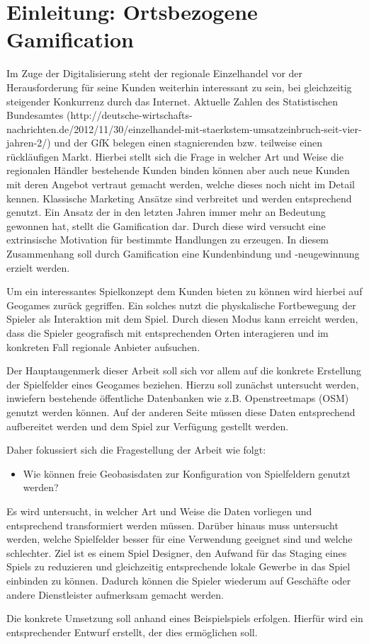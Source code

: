 \chapter{Einleitung: Ortsbezogene Gamification}
\label{ch1:S1_Einleitung}

Im Zuge der Digitalisierung steht der regionale Einzelhandel vor der Herausforderung für seine Kunden weiterhin interessant zu sein, bei gleichzeitig steigender Konkurrenz durch das Internet. Aktuelle Zahlen des Statistischen Bundesamtes (http://deutsche-wirtschafts-nachrichten.de/2012/11/30/einzelhandel-mit-staerkstem-umsatzeinbruch-seit-vier-jahren-2/) und der GfK belegen einen stagnierenden bzw. teilweise einen rückläufigen Markt.
Hierbei stellt sich die Frage in welcher Art und Weise die regionalen Händler bestehende Kunden binden können aber auch neue Kunden mit deren Angebot vertraut gemacht werden, welche dieses noch nicht im Detail kennen.
Klassische Marketing Ansätze sind verbreitet und werden entsprechend genutzt.
Ein Ansatz der in den letzten Jahren immer mehr an Bedeutung gewonnen hat, stellt die Gamification dar. Durch diese wird versucht eine extrinsische Motivation für bestimmte Handlungen zu erzeugen. In diesem Zusammenhang soll durch Gamification eine Kundenbindung und -neugewinnung erzielt werden.

Um ein interessantes Spielkonzept dem Kunden bieten zu können wird hierbei auf Geogames zurück gegriffen.
Ein solches nutzt die physkalische Fortbewegung der Spieler als Interaktion mit dem Spiel.
Durch diesen Modus kann erreicht werden, dass die Spieler geografisch mit entsprechenden Orten interagieren und im konkreten Fall regionale Anbieter aufsuchen.

Der Hauptaugenmerk dieser Arbeit soll sich vor allem auf die konkrete Erstellung der Spielfelder eines Geogames beziehen. Hierzu soll zunächst untersucht werden, inwiefern bestehende öffentliche Datenbanken wie z.B. Openstreetmaps (OSM) genutzt werden können. Auf der anderen Seite müssen diese Daten entsprechend aufbereitet werden und dem Spiel zur Verfügung gestellt werden.

Daher fokussiert sich die Fragestellung der Arbeit wie folgt:
\begin{itemize}
  \item Wie können freie Geobasisdaten zur Konfiguration von Spielfeldern genutzt werden?
\end{itemize}

Es wird untersucht, in welcher Art und Weise die Daten vorliegen und entsprechend transformiert werden müssen.
Darüber hinaus muss untersucht werden, welche Spielfelder besser für eine Verwendung geeignet sind und welche schlechter.
Ziel ist es einem Spiel Designer, den Aufwand für das Staging eines Spiels zu reduzieren und gleichzeitig entsprechende lokale Gewerbe in das Spiel einbinden zu können. Dadurch können die Spieler wiederum auf Geschäfte oder andere Dienstleister aufmerksam gemacht werden.

Die konkrete Umsetzung soll anhand eines Beispielspiels erfolgen.
Hierfür wird ein entsprechender Entwurf erstellt, der dies ermöglichen soll.

